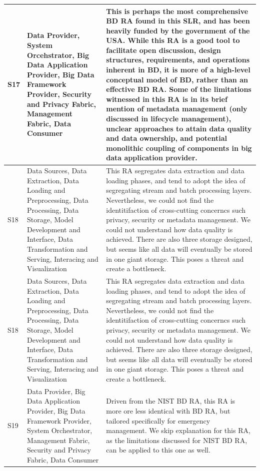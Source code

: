 \documentclass[review]{elsarticle}
\begin{document}
\begin{table}[h!]
\begin{tabular}{ |p{0.5cm}|p{3cm}|p{7.5cm}| }
        \hline
        S17 & Data Provider, System Orcehstrator, Big Data Application Provider, Big Data Framework Provider, Security and Privacy Fabric, Management Fabric, Data Consumer & This is perhaps the most comprehensive BD RA found in this SLR, and has been heavily funded by the government of the USA. While this RA is a good tool to facilitate open discussion, design structures, requirements, and operations inherent in BD, it is more of a high-level conceptual model of BD, rather than an effective BD RA. Some of the limitations witnessed in this RA is in its brief mention of metadata management (only discussed in lifecycle management), unclear approaches to attain data quality and data ownership, and potential monolithic coupling of components in big data application provider. \\
        \hline
        S18 & Data Sources, Data Extraction, Data Loading and Preprocessing, Data Processing, Data Storage, Model Development and Interface, Data Transformation and Serving, Interacing and Visualization & This RA segregates data extraction and data loading phases, and tend to adopt the idea of segregating stream and batch processing layers. Nevertheless, we could not find the identitifaction of cross-cutting concerncs such privacy, security or metadata management. We could not understand how data quality is achieved. There are also three storage designed, but seems like all data will eventually be stored in one giant storage. This poses a threat and create a bottleneck. \\
        \hline
        S18 & Data Sources, Data Extraction, Data Loading and Preprocessing, Data Processing, Data Storage, Model Development and Interface, Data Transformation and Serving, Interacing and Visualization & This RA segregates data extraction and data loading phases, and tend to adopt the idea of segregating stream and batch processing layers. Nevertheless, we could not find the identitifaction of cross-cutting concerncs such privacy, security or metadata management. We could not understand how data quality is achieved. There are also three storage designed, but seems like all data will eventually be stored in one giant storage. This poses a threat and create a bottleneck. \\
        \hline
        S19 & Data Provider, Big Data Application Provider, Big Data Framework Provider, System Orchestrator, Management Fabric, Security and Privacy Fabric, Data Consumer & Driven from the NIST BD RA, this RA is more ore less identical with BD RA, but tailored specifically for emergency management. We skip explanation for this RA, as the limitations discussed for NIST BD RA, can be applied to this one as well. \\

\end{tabular}
\end{table}
\end{document}
